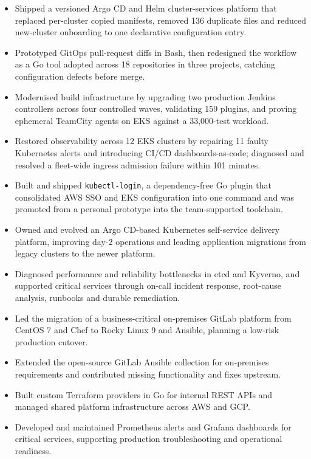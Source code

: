 
\begin{itemize}
  \item Shipped a versioned Argo CD and Helm cluster-services platform that replaced per-cluster copied manifests, removed 136 duplicate files and reduced new-cluster onboarding to one declarative configuration entry.
  \item Prototyped GitOps pull-request diffs in Bash, then redesigned the workflow as a Go tool adopted across 18 repositories in three projects, catching configuration defects before merge.
  \item Modernised build infrastructure by upgrading two production Jenkins controllers across four controlled waves, validating 159 plugins, and proving ephemeral TeamCity agents on EKS against a 33,000-test workload.
  \item Restored observability across 12 EKS clusters by repairing 11 faulty Kubernetes alerts and introducing CI/CD dashboards-as-code; diagnosed and resolved a fleet-wide ingress admission failure within 101 minutes.
  \item Built and shipped \texttt{kubectl-login}, a dependency-free Go plugin that consolidated AWS SSO and EKS configuration into one command and was promoted from a personal prototype into the team-supported toolchain.
\end{itemize}

\companygap
{}
\begin{itemize}
  \item Owned and evolved an Argo CD-based Kubernetes self-service delivery platform, improving day-2 operations and leading application migrations from legacy clusters to the newer platform.
  \item Diagnosed performance and reliability bottlenecks in etcd and Kyverno, and supported critical services through on-call incident response, root-cause analysis, runbooks and durable remediation.
\end{itemize}

\begin{itemize}
  \item Led the migration of a business-critical on-premises GitLab platform from CentOS 7 and Chef to Rocky Linux 9 and Ansible, planning a low-risk production cutover.
  \item Extended the open-source GitLab Ansible collection for on-premises requirements and contributed missing functionality and fixes upstream.
  \item Built custom Terraform providers in Go for internal REST APIs and managed shared platform infrastructure across AWS and GCP.
  \item Developed and maintained Prometheus alerts and Grafana dashboards for critical services, supporting production troubleshooting and operational readiness.
\end{itemize}

